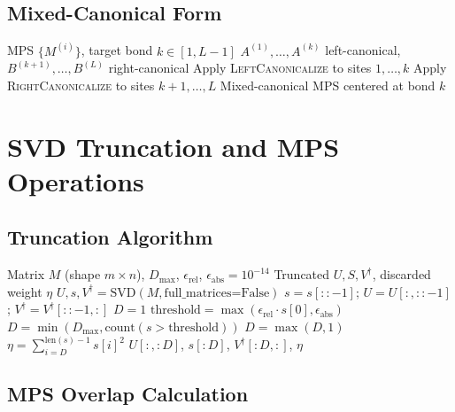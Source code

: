 \documentclass[aps,prb,onecolumn,scriptaddress]{revtex4-2}
\newcommand{\eps}{\epsilon}
\begin{document}
	\subsection{Mixed-Canonical Form}
	
	\begin{algorithm}[H]
		\caption{BringToBond}
		\begin{algorithmic}[1]
			\Require MPS $\{M^{(i)}\}$, target bond $k \in [1, L-1]$
			\Ensure $A^{(1)}, \ldots, A^{(k)}$ left-canonical, $B^{(k+1)}, \ldots, B^{(L)}$ right-canonical
			\State Apply \textsc{LeftCanonicalize} to sites $1, \ldots, k$
			\State Apply \textsc{RightCanonicalize} to sites $k+1, \ldots, L$
			\State \Return Mixed-canonical MPS centered at bond $k$
		\end{algorithmic}
	\end{algorithm}
	
	\section{SVD Truncation and MPS Operations}
	
	\subsection{Truncation Algorithm}
	
	\begin{algorithm}[H]
		\caption{TruncateBond}
		\begin{algorithmic}[1]
			\Require Matrix $M$ (shape $m \times n$), $D_{\max}$, $\eps_{\text{rel}}$, $\eps_{\text{abs}} = 10^{-14}$
			\Ensure Truncated $U, S, V^\dagger$, discarded weight $\eta$
			\State $U, s, V^\dagger = \text{SVD}(M, \text{full\_matrices=False})$
			\State {}
			\State $s = s[::-1]$; $U = U[:, ::-1]$; $V^\dagger = V^\dagger[::-1, :]$
			\EndIf
			\State {}
			\If{$s[0] < \eps_{\text{abs}}$}
			\State $D = 1$ 
			\Else
			\State $\text{threshold} = \max(\eps_{\text{rel}} \cdot s[0], \eps_{\text{abs}})$
			\State $D = \min(D_{\max}, \text{count}(s > \text{threshold}))$
			\State $D = \max(D, 1)$ 
			\EndIf
			\State $\eta = \sum_{i=D}^{\text{len}(s)-1} s[i]^2$ 
			\State \Return $U[:, :D]$, $s[:D]$, $V^\dagger[:D, :]$, $\eta$
		\end{algorithmic}
	\end{algorithm}
	
	\subsection{MPS Overlap Calculation}
	
\end{document}
